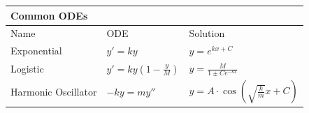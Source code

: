 \documentclass{article}
\newenvironment{bx}[1][]{
\begin{tcolorbox}[colback=white!97!black, title=#1, arc=0in, halign=flush left, left=1mm, right=1mm,]
}{
\end{tcolorbox}
}
\begin{document}
\begin{multicols}{2}
\begin{bx}[Solving ODEs]
\def\arraystretch{1.5}
\begin{tabular}{lll}
\multicolumn{3}{l}{\textbf{Common ODEs}}\\
\toprule[0.4mm]
Name & ODE & Solution\\
\midrule
Exponential & $y'=ky$ & $y=e^{kx+C}$\\
Logistic & $y'=ky\left(1 - \frac{y}{M}\right)$ & $y=\frac{M}{1\pm Ce^{-kx}}$ \\
Harmonic Oscillator & $-ky=my''$ & $y=A\cdot\cos\left(\sqrt{\frac{k}{m}}x+C\right)$\\
\bottomrule[0.4mm]
\end{tabular}


\end{bx}

\end{multicols}
\end{document}
